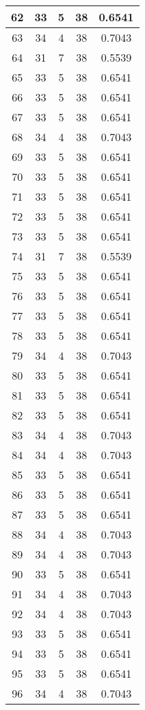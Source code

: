 \documentclass[letterpaper, 12pt]{article}
\begin{document}
\begin{longtable}{|c|c|c|c|c|}
\hline
62 & 33 & 5 & 38 & 0.6541 \\
\hline
63 & 34 & 4 & 38 & 0.7043 \\
\hline
64 & 31 & 7 & 38 & 0.5539 \\
\hline
65 & 33 & 5 & 38 & 0.6541 \\
\hline
66 & 33 & 5 & 38 & 0.6541 \\
\hline
67 & 33 & 5 & 38 & 0.6541 \\
\hline
68 & 34 & 4 & 38 & 0.7043 \\
\hline
69 & 33 & 5 & 38 & 0.6541 \\
\hline
70 & 33 & 5 & 38 & 0.6541 \\
\hline
71 & 33 & 5 & 38 & 0.6541 \\
\hline
72 & 33 & 5 & 38 & 0.6541 \\
\hline
73 & 33 & 5 & 38 & 0.6541 \\
\hline
74 & 31 & 7 & 38 & 0.5539 \\
\hline
75 & 33 & 5 & 38 & 0.6541 \\
\hline
76 & 33 & 5 & 38 & 0.6541 \\
\hline
77 & 33 & 5 & 38 & 0.6541 \\
\hline
78 & 33 & 5 & 38 & 0.6541 \\
\hline
79 & 34 & 4 & 38 & 0.7043 \\
\hline
80 & 33 & 5 & 38 & 0.6541 \\
\hline
81 & 33 & 5 & 38 & 0.6541 \\
\hline
82 & 33 & 5 & 38 & 0.6541 \\
\hline
83 & 34 & 4 & 38 & 0.7043 \\
\hline
84 & 34 & 4 & 38 & 0.7043 \\
\hline
85 & 33 & 5 & 38 & 0.6541 \\
\hline
86 & 33 & 5 & 38 & 0.6541 \\
\hline
87 & 33 & 5 & 38 & 0.6541 \\
\hline
88 & 34 & 4 & 38 & 0.7043 \\
\hline
89 & 34 & 4 & 38 & 0.7043 \\
\hline
90 & 33 & 5 & 38 & 0.6541 \\
\hline
91 & 34 & 4 & 38 & 0.7043 \\
\hline
92 & 34 & 4 & 38 & 0.7043 \\
\hline
93 & 33 & 5 & 38 & 0.6541 \\
\hline
94 & 33 & 5 & 38 & 0.6541 \\
\hline
95 & 33 & 5 & 38 & 0.6541 \\
\hline
96 & 34 & 4 & 38 & 0.7043 \\

\end{longtable}
\end{document}
